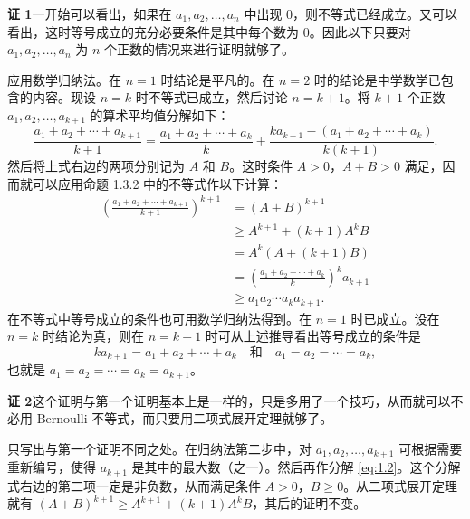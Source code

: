 \begin{xproof}
\textbf{证 1}\quad 一开始可以看出，如果在 $a_1,a_2,\ldots,a_n$ 中出现 $0$，则不等式已经成立。又可以看出，这时等号成立的充分必要条件是其中每个数为 $0$。因此以下只要对 $a_1,a_2,\ldots,a_n$ 为 $n$ 个正数的情况来进行证明就够了。

应用数学归纳法。在 $n=1$ 时结论是平凡的。在 $n=2$ 时的结论是中学数学已包含的内容。现设 $n=k$ 时不等式已成立，然后讨论 $n=k+1$。将 $k+1$ 个正数 $a_1,a_2,\ldots,a_{k+1}$ 的算术平均值分解如下：
\begin{equation}
  \frac{a_1+a_2+\cdots+a_{k+1}}{k+1}
  =\frac{a_1+a_2+\cdots+a_k}{k}
  +\frac{ka_{k+1}-(a_1+a_2+\cdots+a_k)}{k(k+1)}.
  \tag{1.2}
  \label{eq:1.2}
\end{equation}
然后将上式右边的两项分别记为 $A$ 和 $B$。这时条件 $A>0$，$A+B>0$ 满足，因而就可以应用命题 1.3.2 中的不等式作以下计算：
\[
\begin{aligned}
  \left(\frac{a_1+a_2+\cdots+a_{k+1}}{k+1}\right)^{k+1}
  &=(A+B)^{k+1}\\
  &\ge A^{k+1}+(k+1)A^kB\\
  &=A^k(A+(k+1)B)\\
  &=\left(\frac{a_1+a_2+\cdots+a_k}{k}\right)^k a_{k+1}\\
  &\ge a_1a_2\cdots a_ka_{k+1}.
\end{aligned}
\]
在不等式中等号成立的条件也可用数学归纳法得到。在 $n=1$ 时已成立。设在 $n=k$ 时结论为真，则在 $n=k+1$ 时可从上述推导看出等号成立的条件是
\[
  ka_{k+1}=a_1+a_2+\cdots+a_k
  \quad\text{和}\quad
  a_1=a_2=\cdots=a_k,
\]
也就是 $a_1=a_2=\cdots=a_k=a_{k+1}$。
\end{xproof}

\begin{xproof}
\textbf{证 2}\quad 这个证明与第一个证明基本上是一样的，只是多用了一个技巧，从而就可以不必用 Bernoulli 不等式，而只要用二项式展开定理就够了。

只写出与第一个证明不同之处。在归纳法第二步中，对 $a_1,a_2,\ldots,a_{k+1}$ 可根据需要重新编号，使得 $a_{k+1}$ 是其中的最大数（之一）。然后再作分解 \eqref{eq:1.2}。这个分解式右边的第二项一定是非负数，从而满足条件 $A>0$，$B\ge0$。从二项式展开定理就有 $(A+B)^{k+1}\ge A^{k+1}+(k+1)A^kB$，其后的证明不变。
\end{xproof}

